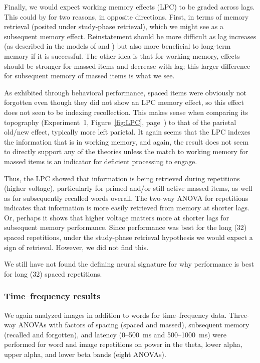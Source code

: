 Finally, we would expect working memory effects (LPC) to be graded across lags.  This could by for two reasons, in opposite directions.  First, in terms of memory retrieval (posited under study-phase retrieval), which we might see as a subsequent memory effect.  Reinstatement should be more difficult as lag increases (as described in the models of  and ) but also more beneficial to long-term memory if it is successful.
The other idea is that for working memory, effects should be stronger for massed items and decrease with lag; this larger difference for subsequent memory of massed items is what we see.

As exhibited through behavioral performance, spaced items were obviously not forgotten even though they did not show an LPC memory effect, so this effect does not seen to be indexing recollection.  This makes sense when comparing its topography (Experiment~1, Figure~\ref{fig:LPC}, page~\pageref{fig:LPC}) to that of the parietal old/new effect, typically more left parietal.
It again seems that the LPC indexes the information that is in working memory, and again, the result does not seem to directly support any of the theories unless the match to working memory for massed items is an indicator for deficient processing to engage.


Thus, the LPC showed that information is being retrieved during repetitions (higher voltage), particularly for primed and/or still active massed items, as well as for subsequently recalled words overall.
The two-way ANOVA for repetitions  indicates that information is more easily retrieved from memory at shorter lags.  Or, perhaps it shows that higher voltage matters more at shorter lags for subsequent memory performance.  Since performance was best for the long (32) spaced repetitions, under the study-phase retrieval hypothesis we would expect a sign of retrieval.  However, we did not find this.

We still have not found the defining neural signature for why performance is best for long (32) spaced repetitions.

\subsubsection{Time--frequency results}

We again analyzed images in addition to words for time--frequency data.
Three-way ANOVAs with factors of spacing (spaced and massed), subsequent memory (recalled and forgotten), and latency (0--500~ms and 500--1000~ms) were performed for word and image repetitions on power in the theta, lower alpha, upper alpha, and lower beta bands (eight ANOVAs).


